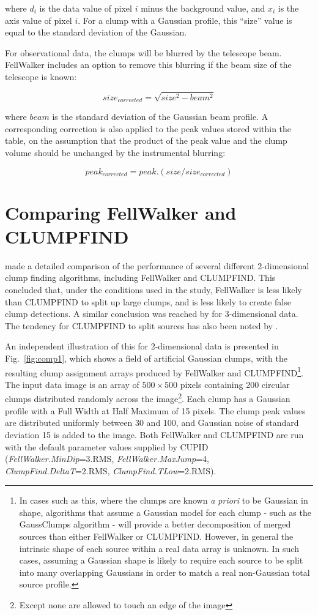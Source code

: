 \documentclass[final,authoryear,5p,times,twocolumn]{elsarticle}
\begin{document}
where $d_{i}$ is the data value of pixel $i$ minus the background value,
and $x_{i}$ is the axis value of pixel $i$. For a clump with a Gaussian
profile, this ``size'' value is equal to the standard deviation of the
Gaussian.

For observational data, the clumps will be blurred by the telescope beam.
FellWalker includes an option to remove this blurring if the beam size of
the telescope is known:

\[ size_{corrected} = \sqrt{ size^{2} - beam^{2} } \]

where $beam$ is the standard deviation of the Gaussian beam profile. A
corresponding correction is also applied to the peak values stored within
the table, on the assumption that the product of the peak value and the
clump volume should be unchanged by the instrumental blurring:

\[ peak_{corrected} = peak.(size/size_{corrected}) \]




\section{Comparing FellWalker and CLUMPFIND}
\label{sec:compare}
\citet{2010Watson} made a detailed comparison of the performance of several
different 2-dimensional clump finding algorithms, including FellWalker and CLUMPFIND.
This concluded that, under the conditions used in the study, FellWalker
is less likely than CLUMPFIND to split up large clumps, and is less
likely to create false clump detections. A similar conclusion was reached
by \citet{2014Christie} for 3-dimensional data. The tendency for CLUMPFIND
to split sources has also been noted by \citet{2006Enoch}.

An independent illustration of this for 2-dimensional data is presented in
Fig.~\ref{fig:comp1}, which shows a field of artificial Gaussian clumps,
with the resulting clump assignment arrays produced by FellWalker and
CLUMPFIND\footnote{In cases such as this, where the clumps are known \emph{a
priori} to be Gaussian in shape, algorithms that assume a Gaussian model
for each clump - such as the GaussClumps algorithm - will provide a better
decomposition of merged sources than either FellWalker or CLUMPFIND. However,
in general the intrinsic shape of each source within a real data array is
unknown. In such cases, assuming a Gaussian shape is likely to require each
source to be split into many overlapping Gaussians in order to match a
real non-Gaussian total source profile.}. The input data image is an array
of $500\times500$ pixels containing 200 circular clumps distributed randomly
across the image\footnote{Except none are allowed to touch an edge of the
image}. Each clump has a Gaussian profile with a Full Width at Half Maximum
of 15 pixels. The clump peak values are distributed uniformly between 30 and
100, and Gaussian noise of standard deviation 15 is added to the image.
Both FellWalker and CLUMPFIND are run with the default parameter values
supplied by CUPID (\emph{FellWalker.MinDip}=3.RMS,
\emph{FellWalker.MaxJump}=4, \emph{ClumpFind.DeltaT}=2.RMS,
\emph{ClumpFind.TLow}=2.RMS).
\end{document}
